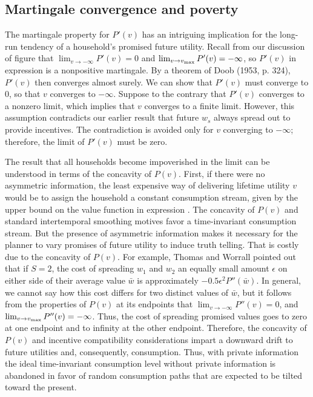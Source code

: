 \subsection{Martingale convergence and poverty}
%
The martingale property   for $P'(v)$ has an intriguing implication for the
long-run tendency of a household's promised future utility. Recall from our discussion of
figure 
that $\lim_{v\rightarrow -\infty}P'(v)=0$ and $\lim_{v\rightarrow
v_{\rm max}}P'(v)=-\infty$, so $P'(v)$ in expression
 is a nonpositive martingale. By a theorem of Doob
(1953, p. 324),
%
$P'(v)$ then converges almost surely.  We can show that
$P'(v)$ must converge to 0, so that $v$ converges to $-\infty$.
Suppose to the contrary that $P'(v)$ converges to a nonzero
limit, which implies that $v$ converges to a finite limit. However,
this assumption contradicts our earlier result that  future $w_s$
always spread out to provide  incentives. The contradiction
is  avoided only for $v$ converging to $-\infty$; therefore, the limit
of $P'(v)$ must be zero.

The result that all households become impoverished in the limit can be
understood in terms of  the concavity of $P(v)$. First, if there were no
asymmetric information, the least expensive way of delivering lifetime
utility $v$ would be to assign the household a constant consumption stream,
given by the upper bound on the value function in expression .
The concavity of $P(v)$ and standard intertemporal
smoothing motives favor a time-invariant consumption stream. But the presence
of asymmetric information makes it necessary for the planner to vary
promises of future utility to induce truth telling. That is costly due
to the concavity of $P(v)$. For example,  Thomas and
Worrall pointed out that  if $S=2$, the cost of spreading $w_1$ and $w_2$ an equally small
amount $\epsilon$ on either side of their average value $\bar w$ is
approximately $-0.5 \epsilon^2 P''(\bar w)$.
In general, we cannot say how this cost differs for  two distinct
values of $\bar w$, but it follows from the properties of $P(v)$
at its endpoints that
$\lim_{v\rightarrow -\infty}P''(v)=0$, and
$\lim_{v\rightarrow v_{\rm max}}P''(v)=-\infty$.
Thus, the cost of spreading promised values goes to zero at one
endpoint and to infinity at the other endpoint.
Therefore, the concavity of
$P(v)$ and incentive compatibility considerations impart  a downward
drift to future utilities and, consequently, consumption.
Thus, with private information the ideal time-invariant consumption level without private information
 is abandoned in favor of random consumption paths that are expected to be  tilted
toward the present.

